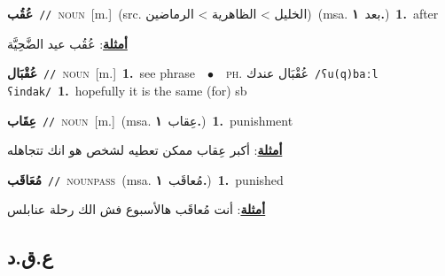 \documentclass[10pt,a4paper,twoside]{article} %
\begin{document}
\begin{multicols}{2}
{\setlength\topsep{0pt}\textbf{\foreignlanguage{arabic}{عُقُب}}\ {\color{gray}\texttt{//}\color{black}}\ \textsc{noun}\ [m.]\ (src. \color{gray}\foreignlanguage{arabic}{الخليل > الظاهرية > الرماضين}\color{black})\ \color{gray}(msa. \foreignlanguage{arabic}{بعد}~\foreignlanguage{arabic}{\textbf{١.}})\color{black}\ \textbf{1.}~after\  \begin{flushright}\color{gray}\foreignlanguage{arabic}{\textbf{\underline{\foreignlanguage{arabic}{أمثلة}}}: عُقُب عيد الضَّحِيَّة}\end{flushright}\color{black}} \vspace{2mm}

{\setlength\topsep{0pt}\textbf{\foreignlanguage{arabic}{عُقْبَال}}\ {\color{gray}\texttt{//}\color{black}}\ \textsc{noun}\ [m.]\ \textbf{1.}~see phrase\ \ $\bullet$\ \ \textsc{ph.} \color{gray} \foreignlanguage{arabic}{عُقْبَال عندك}\color{black}\ {\color{gray}\texttt{/{\sffamily ʕu(q)baːl ʕindak}/}\color{black}}\ \textbf{1.}~hopefully it is the same (for) sb\ } \vspace{2mm}

{\setlength\topsep{0pt}\textbf{\foreignlanguage{arabic}{عِقَاب}}\ {\color{gray}\texttt{//}\color{black}}\ \textsc{noun}\ [m.]\ \color{gray}(msa. \foreignlanguage{arabic}{عِقاب}~\foreignlanguage{arabic}{\textbf{١.}})\color{black}\ \textbf{1.}~punishment\  \begin{flushright}\color{gray}\foreignlanguage{arabic}{\textbf{\underline{\foreignlanguage{arabic}{أمثلة}}}: أكبر عِقاب ممكن تعطيه لشخص هو انك تتجاهله}\end{flushright}\color{black}} \vspace{2mm}

{\setlength\topsep{0pt}\textbf{\foreignlanguage{arabic}{مُعَاقَب}}\ {\color{gray}\texttt{//}\color{black}}\ \textsc{noun\textunderscore pass}\ \color{gray}(msa. \foreignlanguage{arabic}{مُعاقَب}~\foreignlanguage{arabic}{\textbf{١.}})\color{black}\ \textbf{1.}~punished\  \begin{flushright}\color{gray}\foreignlanguage{arabic}{\textbf{\underline{\foreignlanguage{arabic}{أمثلة}}}: أنت مُعاقَب هالأسبوع فش الك رحلة عنابلس}\end{flushright}\color{black}} \vspace{2mm}

\vspace{-3mm}
\subsection*{\color{blue}\foreignlanguage{arabic}{ع.ق.د}\color{blue}{}} 


\end{multicols}
\end{document}
